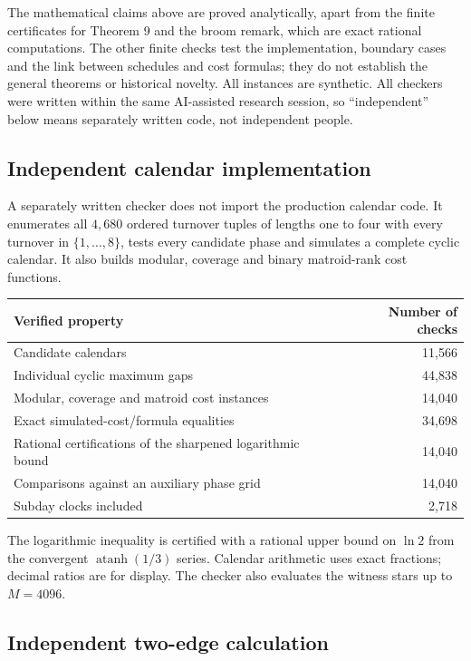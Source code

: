 \documentclass[
  british,
  11pt,
  a4paper,
]{article}
\newcounter{none} %
\begin{document}
The mathematical claims above are proved analytically, apart from the
finite certificates for Theorem 9 and the broom remark, which are exact
rational computations. The other finite checks test the implementation,
boundary cases and the link between schedules and cost formulas; they do
not establish the general theorems or historical novelty. All instances
are synthetic. All checkers were written within the same AI-assisted
research session, so ``independent'' below means separately written
code, not independent people.

\subsection{Independent calendar
implementation}\label{independent-calendar-implementation}

A separately written checker does not import the production calendar
code. It enumerates all \(4,680\) ordered turnover tuples of lengths one
to four with every turnover in \(\{1,\ldots,8\}\), tests every candidate
phase and simulates a complete cyclic calendar. It also builds modular,
coverage and binary matroid-rank cost functions.

{\def\LTcaptype{none} %
\begin{longtable}[]{@{}lr@{}}
\toprule\noalign{}
Verified property & Number of checks \\
\midrule\noalign{}
\endhead
\bottomrule\noalign{}
\endlastfoot
Candidate calendars & 11,566 \\
Individual cyclic maximum gaps & 44,838 \\
Modular, coverage and matroid cost instances & 14,040 \\
Exact simulated-cost/formula equalities & 34,698 \\
Rational certifications of the sharpened logarithmic bound & 14,040 \\
Comparisons against an auxiliary phase grid & 14,040 \\
Subday clocks included & 2,718 \\
\end{longtable}
}

The logarithmic inequality is certified with a rational upper bound on
\(\ln2\) from the convergent \(\operatorname{atanh}(1/3)\) series.
Calendar arithmetic uses exact fractions; decimal ratios are for
display. The checker also evaluates the witness stars up to \(M=4096\).

\subsection{Independent two-edge
calculation}\label{independent-two-edge-calculation}
\end{document}
